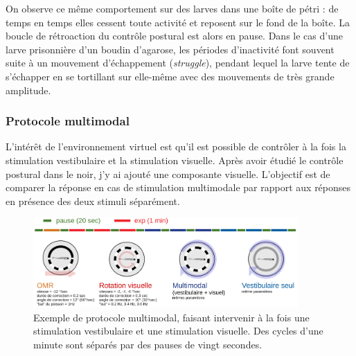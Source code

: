 On observe ce même comportement sur des larves dans une boîte de pétri : de temps en temps elles cessent toute activité et reposent sur le fond de la boîte. La boucle de rétroaction du contrôle postural est alors en pause. Dans le cas d'une larve prisonnière d'un boudin d'agarose, les périodes d'inactivité font souvent suite à un mouvement d'échappement (\emph{struggle}), pendant lequel la larve tente de s'échapper en se tortillant sur elle-même avec des mouvements de très grande amplitude.

\subsubsection{Protocole multimodal}
L'intérêt de l'environnement virtuel est qu'il est possible de contrôler à la fois la stimulation vestibulaire et la stimulation visuelle. Après avoir étudié le contrôle postural dans le noir, j'y ai ajouté une composante visuelle. L'objectif est de comparer la réponse en cas de stimulation multimodale par rapport aux réponses en présence des deux stimuli séparément.

\begin{figure}
\centering
\includegraphics[width=0.9\textwidth]{./files/protocole_multimodal.svg.png}
\caption{
Exemple de protocole multimodal, faisant intervenir à la fois une stimulation vestibulaire et une stimulation visuelle. Des cycles d'une minute sont séparés par des pauses de vingt secondes.
}
\end{figure}

